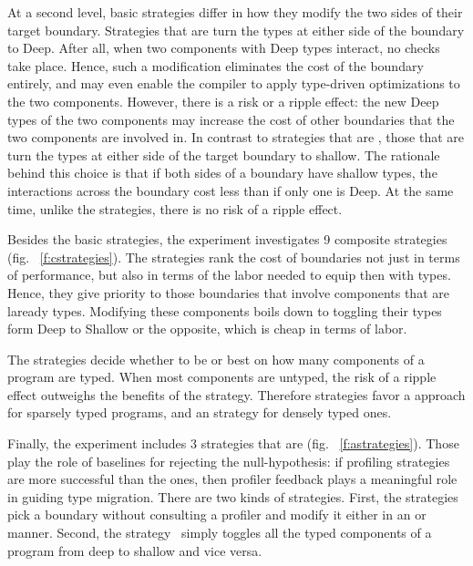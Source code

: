  At a second level, basic strategies differ in how they modify the two sides of
 their target boundary. Strategies that are \optkw{} turn the types at
 either side of the boundary to Deep. After all, when two components with
 Deep types interact, no checks take place. Hence, such a modification
 eliminates the cost of the boundary entirely, and may even enable the
 compiler to apply type-driven optimizations to the two components. 
 However, there is a risk or
 a ripple effect: the new Deep types of the two components may increase
 the cost of other boundaries that the two components are involved in. In
 contrast to strategies that are \optkw{}, those that are \conkw{} turn
 the types at either side of the target boundary to shallow. The rationale
 behind this choice is that if both sides of a boundary have
 shallow types, the interactions across the boundary cost less than if
 only one is Deep. At the same time, unlike the  \optkw{}
 strategies,  there is no risk of a ripple effect. 

 Besides the basic strategies, the experiment investigates 9 composite
 strategies (fig. ~\ref{f:cstrategies}). The \costkw{} strategies rank the
 cost of boundaries not just in terms of performance, but also in terms of
 the labor needed to equip then with types.  Hence, they give priority to
 those boundaries that involve components that are laready types.
 Modifying these components boils down to toggling their types form Deep
 to Shallow or the opposite, which is cheap in terms of labor. 
 
 The \confkw{} strategies decide whether to be
 \optkw{} or \conkw{} best on how many components of a program are typed.
 When most components are untyped, the risk of a ripple effect outweighs
 the benefits of the \optkw{} strategy. Therefore strategies favor a
 \conkw{} approach for sparsely typed programs, and an \optkw{} strategy
 for densely typed ones.

 Finally, the experiment includes 3 strategies that are \agnostickw{}
 (fig. ~\ref{f:astrategies}). Those
 play the role of baselines for rejecting the null-hypothesis: if 
 profiling strategies are more successful than the
 \agnostickw{} ones, then profiler feedback plays a meaningful role in
 guiding type migration. There are two kinds of  \agnostickw{} strategies. 
 First, the \randkw{} strategies pick a boundary without consulting a profiler
 and modify it either in an \optkw{} or \conkw{} manner. Second, the
 \togglekw{} strategy~\cite{g-dsgt} simply toggles all the typed components of a program
 from deep to shallow and vice versa. 

